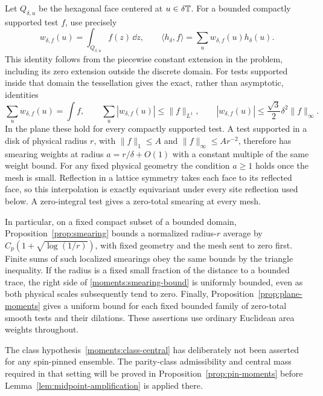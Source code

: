Let $Q_{\delta,u}$ be the hexagonal face centered at $u\in\delta\mathbb T$.
For a bounded compactly supported test $f$, use precisely
\begin{equation}\label{moments:area-weights}
 w_{\delta,f}(u)=\int_{Q_{\delta,u}}f(z)\,\dd z,
 \qquad
 \langle h_\delta,f\rangle
 =\sum_u w_{\delta,f}(u)h_\delta(u).
\end{equation}
This identity follows from the piecewise constant extension in the
problem, including its zero extension outside the discrete domain.
For tests supported inside that domain the tessellation gives the
exact, rather than asymptotic, identities
\[
 \sum_u w_{\delta,f}(u)=\int f,
 \qquad \sum_u|w_{\delta,f}(u)|\leq\|f\|_{L^1},
 \qquad |w_{\delta,f}(u)|\leq\frac{\sqrt3}{2}\delta^2\|f\|_\infty.
\]
In the plane these hold for every compactly supported test.  A test
supported in a disk of physical radius $r$, with
$\|f\|_1\leq A$ and $\|f\|_\infty\leq Ar^{-2}$, therefore has
smearing weights at radius $a=r/\delta+O(1)$ with a constant multiple
of the same weight bound.  For any fixed physical geometry the
condition $a\geq1$ holds once the mesh is small.  Reflection in a
lattice symmetry takes each face to its reflected face, so this
interpolation is exactly equivariant under every site reflection used
below.  A zero-integral test gives a zero-total smearing at every mesh.

In particular, on a fixed compact subset of a bounded domain,
Proposition~\ref{prop:smearing} bounds a normalized radius-$r$ average
by $C_p(1+\sqrt{\log(1/r)})$, with fixed geometry and the mesh sent
to zero first.  Finite sums of such localized smearings obey the same
bounds by the triangle inequality.  If the radius is a fixed small
fraction of the distance to a bounded trace, the right side of
\eqref{moments:smearing-bound} is uniformly bounded, even as both
physical scales subsequently tend to zero.  Finally,
Proposition~\ref{prop:plane-moments} gives a uniform bound for each
fixed bounded family of zero-total smooth tests and their dilations.
These assertions use ordinary Euclidean area weights throughout.

The class hypothesis~\eqref{moments:class-central} has deliberately
not been asserted for any spin-pinned ensemble.  The parity-class
admissibility and central mass required in that setting will be proved
in Proposition~\ref{prop:pin-moments} before
Lemma~\ref{lem:midpoint-amplification} is applied there.
